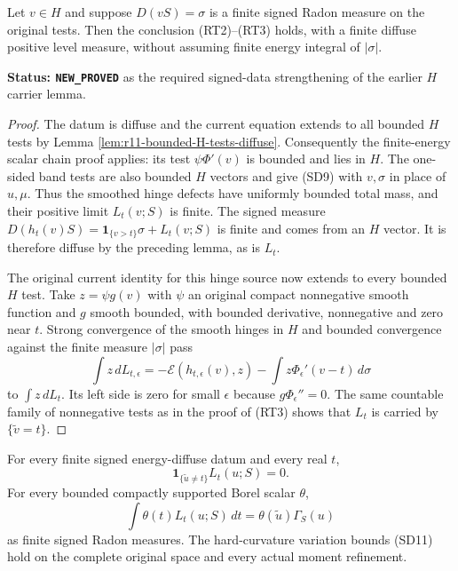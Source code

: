 \begin{lemma}
\label{lem:r11-H-level-carrier-finite-signed}
Let $v\in H$ and suppose $D(vS)=\sigma$ is a finite signed
Radon measure on the original tests.  Then the conclusion
(RT2)--(RT3) holds, with a finite diffuse positive level
measure, without assuming finite energy integral of
$|\sigma|$.
\end{lemma}

\noindent\textbf{Status: \texttt{NEW\_PROVED}} as the required
signed-data strengthening of the earlier $H$ carrier lemma.

\begin{proof}
The datum is diffuse and the current equation extends to
all bounded $H$ tests by Lemma
\ref{lem:r11-bounded-H-tests-diffuse}.
Consequently the finite-energy scalar chain proof applies:
its test $\psi\Phi'(v)$ is bounded and lies in $H$.
The one-sided band tests are also bounded $H$ vectors and
give (SD9) with $v,\sigma$ in place of $u,\mu$.
Thus the smoothed hinge defects have uniformly bounded
total mass, and their positive limit $L_t(v;S)$ is finite.
The signed measure
$D(h_t(v)S)=\mathbf1_{\{v>t\}}\sigma+L_t(v;S)$ is finite
and comes from an $H$ vector.  It is therefore diffuse by
the preceding lemma, as is $L_t$.

The original current identity for this hinge source now
extends to every bounded $H$ test.  Take
$z=\psi g(v)$ with $\psi$ an original compact nonnegative
smooth function and $g$ smooth bounded, with bounded
derivative, nonnegative and zero near $t$.
Strong convergence of the smooth hinges in $H$ and bounded
convergence against the finite measure $|\sigma|$ pass
\[
 \int z\,dL_{t,\epsilon}
     =-\mathcal E(h_{t,\epsilon}(v),z)
              -\int z\Phi_\epsilon'(v-t)\,d\sigma
\]
to $\int z\,dL_t$.
Its left side is zero for small $\epsilon$ because
$g\Phi_\epsilon''=0$.  The same countable family of
nonnegative tests as in the proof of (RT3) shows that
$L_t$ is carried by $\{\widetilde v=t\}$.
\end{proof}

\begin{theorem}
\label{thm:r11-signed-diffuse-exact-level}
For every finite signed energy-diffuse datum and every real $t$,
\[
                    \mathbf1_{\{\widetilde u\ne t\}}L_t(u;S)=0.
 \tag{SD13}
\]
For every bounded compactly supported Borel scalar $\theta$,
\[
                \int\theta(t)L_t(u;S)\,dt
                         =\theta(\widetilde u)\Gamma_S(u)
 \tag{SD14}
\]
as finite signed Radon measures.  The hard-curvature
variation bounds (SD11) hold on the complete original
space and every actual moment refinement.
\end{theorem}

